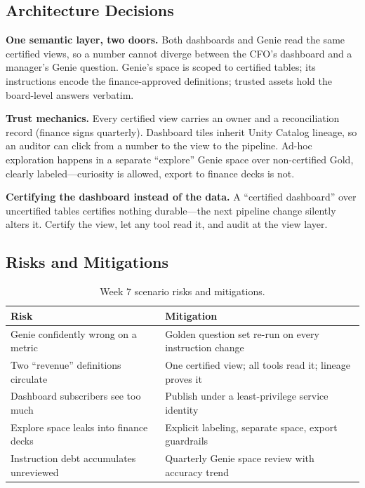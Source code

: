 \subsection{Architecture Decisions}
\textbf{One semantic layer, two doors.} Both dashboards and Genie read the same certified views, so a number cannot diverge between the CFO's dashboard and a manager's Genie question. Genie's space is scoped to certified tables; its instructions encode the finance-approved definitions; trusted assets hold the board-level answers verbatim.

\textbf{Trust mechanics.} Every certified view carries an owner and a reconciliation record (finance signs quarterly). Dashboard tiles inherit Unity Catalog lineage, so an auditor can click from a number to the view to the pipeline. Ad-hoc exploration happens in a separate ``explore'' Genie space over non-certified Gold, clearly labeled---curiosity is allowed, export to finance decks is not.

\begin{pitfall}
\textbf{Certifying the dashboard instead of the data.} A ``certified dashboard'' over uncertified tables certifies nothing durable---the next pipeline change silently alters it. Certify the view, let any tool read it, and audit at the view layer.
\end{pitfall}

\subsection{Risks and Mitigations}
\begin{table}[H]
\centering
\small
\begin{tabular}{@{}p{4.6cm}p{7.6cm}@{}}
\toprule
\textbf{Risk} & \textbf{Mitigation} \\
\midrule
Genie confidently wrong on a metric & Golden question set re-run on every instruction change \\
Two ``revenue'' definitions circulate & One certified view; all tools read it; lineage proves it \\
Dashboard subscribers see too much & Publish under a least-privilege service identity \\
Explore space leaks into finance decks & Explicit labeling, separate space, export guardrails \\
Instruction debt accumulates unreviewed & Quarterly Genie space review with accuracy trend \\
\bottomrule
\end{tabular}
\caption{Week 7 scenario risks and mitigations.}
\label{tab:ch7-risks}
\end{table}

